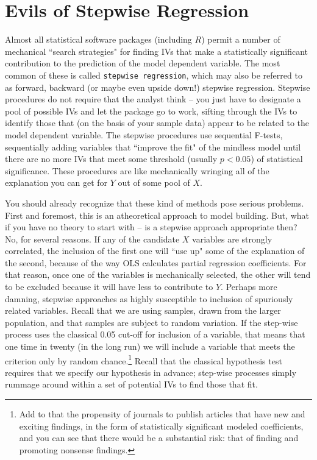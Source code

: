 \documentclass[11pt,openany]{book}\usepackage[]{graphicx}\usepackage[]{color}
\begin{document}
{\section{Evils of Stepwise Regression}

Almost all statistical software packages (including $R$) permit a number of mechanical ``search strategies" for finding IVs that make a statistically significant contribution to the prediction of the model dependent variable. The most common of these is called \texttt{stepwise regression}, which may also be referred to as forward, backward (or maybe even upside down!) stepwise regression. Stepwise procedures do not require that the analyst think -- you just have to designate a pool of possible IVs and let the package go to work, sifting through the IVs to identify those that (on the
basis of your sample data) appear to be related to the model dependent variable.  The stepwise procedures use sequential F-tests, sequentially adding variables that ``improve the fit" of the mindless model until there are no more IVs that meet some threshold (usually $p<0.05$) of statistical significance. These procedures are like mechanically wringing all of the explanation you can get for $Y$ out of some pool of $X$.

You should already recognize that these kind of methods pose serious problems. First and foremost, this is an atheoretical approach to model building. But, what if you have no theory to start with -- is a stepwise approach appropriate then? No, for several reasons. If any of the candidate $X$ variables are strongly correlated, the inclusion of the first one will ``use up" some of the explanation of the second, because of the way OLS calculates partial regression coefficients. For that reason, once one of the variables is mechanically selected, the other will tend to be excluded because it will have less to contribute to $Y$. Perhaps more damning, stepwise approaches as highly susceptible to inclusion of spuriously related variables. Recall that we are using samples, drawn from the larger population, and that samples are subject to random variation. If the step-wise process uses the classical 0.05 cut-off for inclusion of a variable, that means that one time in twenty (in the long run) we will include a variable that meets the criterion only by random chance.\footnote{Add to that the propensity of journals to publish articles that have new and exciting findings, in the form of statistically significant modeled coefficients, and you can see that there would be a substantial risk: that of finding and promoting nonsense findings.} Recall that the classical hypothesis test requires that we specify our hypothesis in advance; step-wise processes simply rummage around within a set of potential IVs to find those that fit.

}
\end{document}
